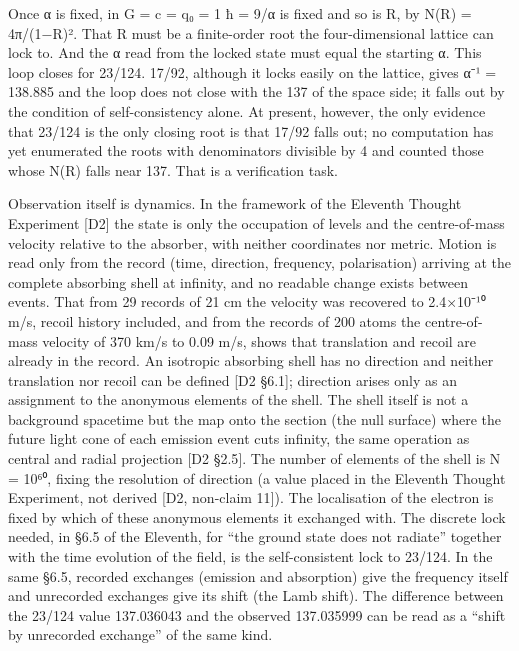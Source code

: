 \documentclass[
  a4paper,
]{article}
\begin{document}
Once α is fixed, in G = c = q₀ = 1 ħ = 9/α is fixed and so is R, by N(R)
= 4π/(1−R)². That R must be a finite-order root the four-dimensional
lattice can lock to. And the α read from the locked state must equal the
starting α. This loop closes for 23/124. 17/92, although it locks easily
on the lattice, gives α⁻¹ = 138.885 and the loop does not close with the
137 of the space side; it falls out by the condition of self-consistency
alone. At present, however, the only evidence that 23/124 is the only
closing root is that 17/92 falls out; no computation has yet enumerated
the roots with denominators divisible by 4 and counted those whose N(R)
falls near 137. That is a verification task.

Observation itself is dynamics. In the framework of the Eleventh Thought
Experiment {[}D2{]} the state is only the occupation of levels and the
centre-of-mass velocity relative to the absorber, with neither
coordinates nor metric. Motion is read only from the record (time,
direction, frequency, polarisation) arriving at the complete absorbing
shell at infinity, and no readable change exists between events. That
from 29 records of 21 cm the velocity was recovered to 2.4×10⁻¹⁰ m/s,
recoil history included, and from the records of 200 atoms the
centre-of-mass velocity of 370 km/s to 0.09 m/s, shows that translation
and recoil are already in the record. An isotropic absorbing shell has
no direction and neither translation nor recoil can be defined {[}D2
§6.1{]}; direction arises only as an assignment to the anonymous
elements of the shell. The shell itself is not a background spacetime
but the map onto the section (the null surface) where the future light
cone of each emission event cuts infinity, the same operation as central
and radial projection {[}D2 §2.5{]}. The number of elements of the shell
is N = 10⁶⁰, fixing the resolution of direction (a value placed in the
Eleventh Thought Experiment, not derived {[}D2, non-claim 11{]}). The
localisation of the electron is fixed by which of these anonymous
elements it exchanged with. The discrete lock needed, in §6.5 of the
Eleventh, for ``the ground state does not radiate'' together with the
time evolution of the field, is the self-consistent lock to 23/124. In
the same §6.5, recorded exchanges (emission and absorption) give the
frequency itself and unrecorded exchanges give its shift (the Lamb
shift). The difference between the 23/124 value 137.036043 and the
observed 137.035999 can be read as a ``shift by unrecorded exchange'' of
the same kind.
\end{document}
